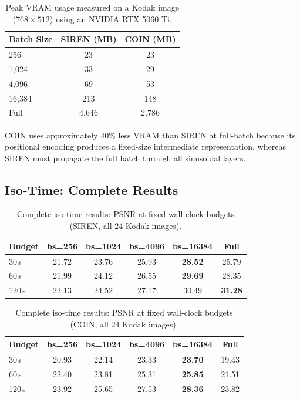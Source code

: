 \documentclass[a4paper,oneside,11pt,english]{scrartcl}
\begin{document}
\begin{table}[H]
\centering
\caption{Peak VRAM usage measured on a Kodak image ($768 \times 512$)
using an NVIDIA RTX 5060 Ti.}
\label{tab:vram_full}
\begin{tabular}{lcc}
\toprule
Batch Size & SIREN (MB) & COIN (MB) \\
\midrule
256    & 23   & 23  \\
1{,}024   & 33   & 29  \\
4{,}096   & 69   & 53  \\
16{,}384  & 213  & 148 \\
Full   & 4{,}646 & 2{,}786 \\
\bottomrule
\end{tabular}
\end{table}

COIN uses approximately 40\% less VRAM than SIREN at full-batch because
its positional encoding produces a fixed-size intermediate representation,
whereas SIREN must propagate the full batch through all sinusoidal layers.

\subsection{Iso-Time: Complete Results}

\begin{table}[H]
\centering
\caption{Complete iso-time results: PSNR at fixed wall-clock budgets
(SIREN, all 24 Kodak images).}
\label{tab:isotime_full}
\begin{tabular}{lccccc}
\toprule
Budget & bs=256 & bs=1024 & bs=4096 & bs=16384 & Full \\
\midrule
30\,s  & 21.72 & 23.76 & 25.93 & \textbf{28.52} & 25.79 \\
60\,s  & 21.99 & 24.12 & 26.55 & \textbf{29.69} & 28.35 \\
120\,s & 22.13 & 24.52 & 27.17 & 30.49 & \textbf{31.28} \\
\bottomrule
\end{tabular}
\end{table}

\begin{table}[H]
\centering
\caption{Complete iso-time results: PSNR at fixed wall-clock budgets
(COIN, all 24 Kodak images).}
\label{tab:isotime_coin_full}
\begin{tabular}{lccccc}
\toprule
Budget & bs=256 & bs=1024 & bs=4096 & bs=16384 & Full \\
\midrule
30\,s  & 20.93 & 22.14 & 23.33 & \textbf{23.70} & 19.43 \\
60\,s  & 22.40 & 23.81 & 25.31 & \textbf{25.85} & 21.51 \\
120\,s & 23.92 & 25.65 & 27.53 & \textbf{28.36} & 23.82 \\
\bottomrule
\end{tabular}
\end{table}
\end{document}
